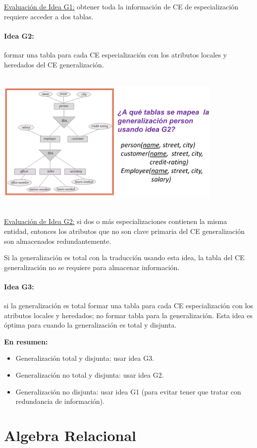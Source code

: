 \documentclass[12pt,a4paper]{report}
\begin{document}
				\underline{Evaluación de Idea G1:} obtener toda la información de CE de especialización requiere acceder a dos tablas.
			
			\subsubsection{Idea G2:} formar una tabla para cada CE especialización con los atributos locales y heredados del CE generalización.
			
				\begin{center}
					\includegraphics[width=11cm, height=7cm]{./imagenes/g2.png}
				\end{center}
			
				\underline{Evaluación de Idea G2:} si dos o más especializaciones contienen la misma entidad, entonces los atributos que no son clave primaria del CE generalización son almacenados redundantemente.
				
				\par Si la generalización es total con la traducción usando esta idea, la tabla del CE generalización no se requiere para almacenar información.
			
			\subsubsection{Idea G3:} si la generalización es total formar una tabla para cada CE especialización con los atributos locales y heredados; no formar tabla para la generalización. Esta idea es óptima para cuando la generalización es total y disjunta.

			\vspace{7mm}
			\textbf{En resumen:}
			\begin{itemize}
				\item Generalización total y disjunta: usar idea G3.
				\item Generalización no total y disjunta: usar idea G2.
				\item Generalización no disjunta: usar idea G1 (para evitar tener que tratar con redundancia de información).
			\end{itemize}

			
\chapter{Algebra Relacional}
		
\end{document}

